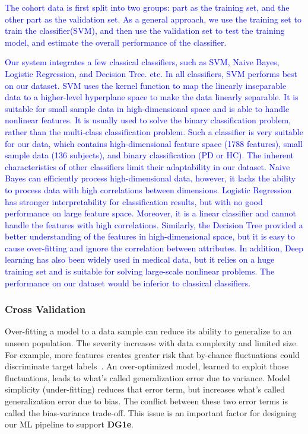 \textcolor{blue}{The cohort data is first split into two groups: part as the training set, and the other part as the validation set. As a general approach, we use the training set to train the classifier(SVM), and then use the validation set to test the training model, and estimate the overall performance of the classifier.} 

\textcolor{blue}{Our system integrates a few classical classifiers, such as SVM, Naive Bayes, Logistic Regression, and Decision Tree. etc. In all classifiers, SVM performs best on our dataset. SVM uses the kernel function to map the linearly inseparable data to a higher-level hyperplane space to make the data linearly separable. It is suitable for small sample data in high-dimensional space and is able to handle nonlinear features. It is usually used to solve the binary classification problem, rather than the multi-class classification problem. Such a classifier is very suitable for our data, which contains high-dimensional feature space (1788 features), small sample data (136 subjects), and binary classification (PD or HC). The inherent characteristics of other classifiers limit their adaptability in our dataset. Naive Bayes can efficiently process high-dimensional data, however, it lacks the ability to process data with high correlations between dimensions. Logistic Regression has stronger interpretability for classification results, but with no good performance on large feature space. Moreover, it is a linear classifier and cannot handle the features with high correlations. Similarly, the Decision Tree provided a better understanding of the features in high-dimensional space, but it is easy to cause over-fitting and ignore the correlation between attributes. In addition, Deep learning has also been widely used in medical data, but it relies on a huge training set and is suitable for solving large-scale nonlinear problems. The performance on our dataset would be inferior to classical classifiers.}


\subsubsection{Cross Validation}
\label{sec:CrossValidation}


\noindent Over-fitting a model to a data sample can reduce its ability to generalize to an unseen population. The severity increases with data complexity and limited size. For example, more features creates greater risk that by-chance fluctuations could discriminate target labels~\cite{krawczuk2016feature}. An over-optimized model, learned to exploit those fluctuations, leads to what's called generalization error due to variance. Model simplicity (under-fitting) reduces that error term, but increases what's called generalization error due to bias.
The conflict between these two error terms is called the bias-variance trade-off. This issue is an important factor for designing our ML pipeline to support \textbf{DG1e}.

